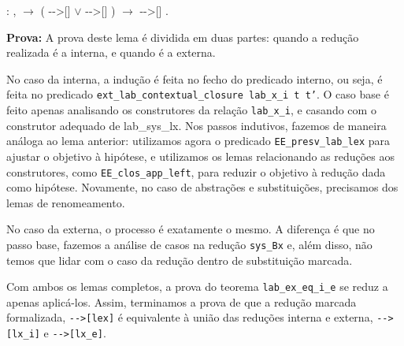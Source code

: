 \bigskip

\coqdocnoindent {} :
\coqdockw{\ensuremath{\forall}}  ,
  \ensuremath{\rightarrow} (
-{}->[]  \ensuremath{\lor} 
-{}->[] ) \ensuremath{\rightarrow} 
-{}->[] .\coqdoceol

\begin{addmargin}[1em]{2em}
\textbf{Prova:} A prova deste lema é dividida em duas partes: quando a redução realizada é a
interna, e quando é a externa. 

No caso da interna, a indução é feita no fecho do predicado interno, ou seja, é
feita no predicado \texttt{ext\_lab\_contextual\_closure lab\_x\_i t t'}. O caso
base é feito apenas analisando os construtores da relação \texttt{lab\_x\_i}, e
casando com o construtor adequado de lab\_sys\_lx. Nos passos indutivos, fazemos
de maneira análoga ao lema anterior: utilizamos agora o predicado
\texttt{EE\_presv\_lab\_lex} para ajustar o objetivo à hipótese, e utilizamos os
lemas relacionando as reduções aos construtores, como
\texttt{EE\_clos\_app\_left}, para reduzir o objetivo à redução dada como
hipótese. Novamente, no caso de abstrações e substituições, precisamos dos lemas
de renomeamento.

No caso da externa, o processo é exatamente o mesmo. A diferença é que no passo
base, fazemos a análise de casos na redução \texttt{sys\_Bx} e, além disso, não
temos que lidar com o caso da redução dentro de substituição marcada.
\end{addmargin}

\bigskip

Com ambos os lemas completos, a prova do teorema \texttt{lab\_ex\_eq\_i\_e} se
reduz a apenas aplicá-los. Assim, terminamos a prova de que a redução marcada
formalizada, \texttt{-{}->[lex]} é equivalente à união das reduções interna
e externa, \texttt{-{}->[lx\_i]} e \texttt{-{}->[lx\_e]}.
